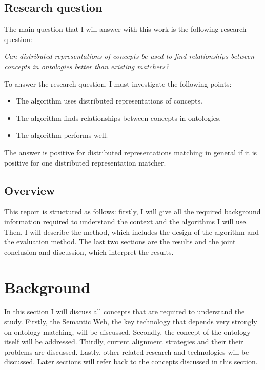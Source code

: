 \documentclass{article}
\begin{document}
 \subsection{Research question} \label{researchquestion}
 The main question that I will answer with this work is the following research question:
 
 \begin{center}
 \textit{
 Can distributed representations of concepts be used to find relationships between concepts in ontologies better than existing matchers?
 }
 \end{center}
 
 To answer the research question, I must investigate the following points:
 \begin{itemize}
 \item The algorithm uses distributed representations of concepts.
 \item The algorithm finds relationships between concepts in ontologies.
 \item The algorithm performs well.
 \end{itemize}
 
 The answer is positive for distributed representations matching in general if it is positive for one distributed representation matcher.
 
 \subsection{Overview}
 This report is structured as follows: firstly, I will give all the required background information required to understand the context and the algorithms I will use. Then, I will describe the method, which includes the design of the algorithm and the evaluation method. The last two sections are the results and the joint conclusion and discussion, which interpret the results.
 
\newpage
\section{Background}
 In this section I will discuss all concepts that are required to understand the study. Firstly, the Semantic Web, the key technology that depends very strongly on ontology matching, will be discussed. Secondly, the concept of the ontology itself will be addressed. Thirdly, current alignment strategies and their their problems are discussed. Lastly, other related research and technologies will be discussed. Later sections will refer back to the concepts discussed in this section.
\end{document}
